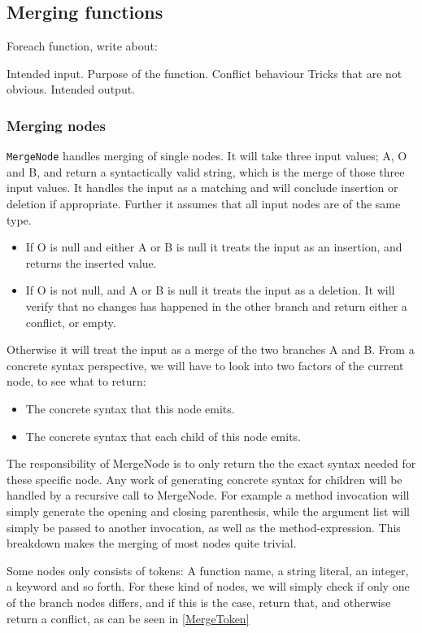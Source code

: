\documentclass[11pt]{article}
\begin{document}
\subsection{Merging functions}
Foreach function, write about:

Intended input.
Purpose of the function.
Conflict behaviour
Tricks that are not obvious.
Intended output.

\subsubsection{Merging nodes}
\texttt{MergeNode} handles merging of single nodes. It will take three input values; A, O and B, and return a syntactically valid string, which is the merge of those three input values. It handles the input as a matching and will conclude insertion or deletion if appropriate. Further it assumes that all input nodes are of the same type.

\begin{itemize}
   \item If O is null and either A or B is null it treats the input as an insertion, and returns the inserted value.
   \item If O is not null, and A or B is null it treats the input as a deletion. It will verify that no changes has happened in the other branch and return either a conflict, or empty.
\end{itemize}

Otherwise it will treat the input as a merge of the two branches A and B. From a concrete syntax perspective, we will have to look into two factors of the current node, to see what to return:

\begin{itemize}
   \item The concrete syntax that this node emits.
   \item The concrete syntax that each child of this node emits.
\end{itemize}

The responsibility of MergeNode is to only return the the exact syntax needed for these specific node. Any work of generating concrete syntax for children will be handled by a recursive call to MergeNode. For example a method invocation will simply generate the opening and closing parenthesis, while the argument list will simply be passed to another invocation, as well as the method-expression. This breakdown makes the merging of most nodes quite trivial.

Some nodes only consists of tokens: A function name, a string literal, an integer, a keyword and so forth. For these kind of nodes, we will simply check if only one of the branch nodes differs, and if this is the case, return that, and otherwise return a conflict, as can be seen in \ref{MergeToken}
\end{document}
